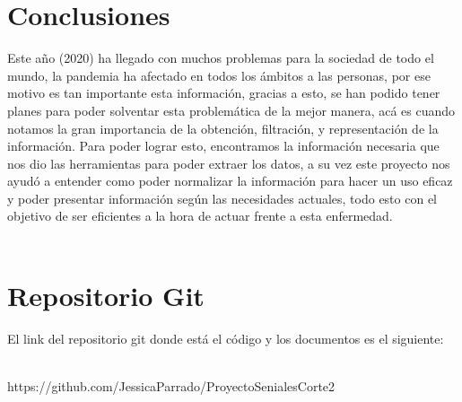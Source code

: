 \documentclass[conference,compsoc,onecolumn]{IEEEtran}
\begin{document}
\section{Conclusiones}
\label{sec:conclusions}
Este año (2020) ha llegado con muchos problemas para la sociedad de todo el mundo, la pandemia ha afectado en todos los ámbitos a las personas, por ese motivo es tan importante esta información, gracias a esto, se han podido tener planes para poder solventar esta problemática de la mejor manera, acá es cuando notamos la gran importancia de la obtención, filtración, y representación de la información. Para poder lograr esto, encontramos la información necesaria que nos dio las herramientas para poder extraer los datos, a su vez este proyecto nos ayudó a entender como poder normalizar la información para hacer un uso eficaz y poder presentar información según las necesidades actuales, todo esto con el objetivo de ser eficientes a la hora de actuar frente a esta enfermedad.
\\\

\section{Repositorio Git}
\label{sec:Repositorio}

El link del repositorio git donde está el código y los documentos es el siguiente:
\\\

https://github.com/JessicaParrado/ProyectoSenialesCorte2
\\\

\\\
\nocite{*}

\label{sec:biblio}
 





\end{document}
